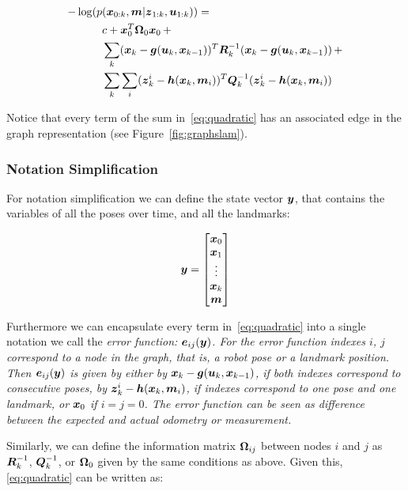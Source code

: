 \begin{equation}
\begin{split}
-\log(p&(\boldsymbol{x}_{0:k},\boldsymbol{m}|\boldsymbol{z}_{1:k},\boldsymbol{u}_{1:k})) =\\ 
&c+\boldsymbol{x}_0^T \boldsymbol{\Omega}_0 \boldsymbol{x}_0\,+\\
&\sum_{k} (\boldsymbol{x}_k-\boldsymbol{g}(\boldsymbol{u}_k,\boldsymbol{x}_{k-1}))^T
\boldsymbol{R}_k^{-1}(\boldsymbol{x}_k-\boldsymbol{g}(\boldsymbol{u}_k,\boldsymbol{x}_{k-1}))\,+\\
&\sum_{k}\sum_{i}(\boldsymbol{z}_k^i-\boldsymbol{h}(\boldsymbol{x}_k,\boldsymbol{m}_i))^T
\boldsymbol{Q}_k^{-1}(\boldsymbol{z}_k^i-\boldsymbol{h}(\boldsymbol{x}_k,\boldsymbol{m}_i))
\label{eq:quadratic}
\end{split}
\end{equation}

Notice that every term of the sum in~\eqref{eq:quadratic} has an associated edge in the graph representation (see Figure~\ref{fig:graphslam}). 

\subsubsection{Notation Simplification}

For notation simplification we can define the state vector $\boldsymbol{y}$, that contains the variables of all the poses over time, and all the landmarks:

\begin{equation}
\boldsymbol{y} = \begin{bmatrix}
\boldsymbol{x}_0\\
\boldsymbol{x}_1\\
\vdots\\
\boldsymbol{x}_k\\
\boldsymbol{m}
\end{bmatrix}
\end{equation}

Furthermore we can encapsulate every term in~\eqref{eq:quadratic} into a single notation we call the \it{error function}: $\boldsymbol{e}_{ij}(\boldsymbol{y})$. For the error function indexes $i$, $j$ correspond to a node in the graph, that is, a robot pose or a landmark position. Then $\boldsymbol{e}_{ij}(\boldsymbol{y})$ is given by either by $\boldsymbol{x}_k-\boldsymbol{g}(\boldsymbol{u}_k,\boldsymbol{x}_{k-1})$, if both indexes correspond to consecutive poses, by $\boldsymbol{z}_k^i-\boldsymbol{h}(\boldsymbol{x}_k,\boldsymbol{m}_i)$, if indexes correspond to one pose and one landmark, or $\boldsymbol{x}_0$ if $i=j=0$. The error function can be seen as difference between the expected and actual odometry or measurement. 

Similarly, we can define the information matrix $\boldsymbol{\Omega}_{ij}$ between nodes $i$ and $j$ as $\boldsymbol{R}_k^{-1}$, $\boldsymbol{Q}_k^{-1}$, or $\boldsymbol{\Omega}_0$ given by the same conditions as above. Given this,\eqref{eq:quadratic} can be written as:

